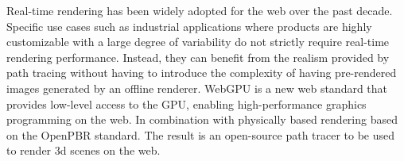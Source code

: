 
Real-time rendering has been widely adopted for the web over the past decade. Specific use cases such as industrial applications where products are highly customizable with a large degree of variability do not strictly require real-time rendering performance. Instead, they can benefit from the realism provided by path tracing without having to introduce the complexity of having pre-rendered images generated by an offline renderer. WebGPU is a new web standard that provides low-level access to the GPU, enabling high-performance graphics programming on the web. In combination with physically based rendering based on the OpenPBR standard. The result is an open-source path tracer to be used to render 3d scenes on the web.
